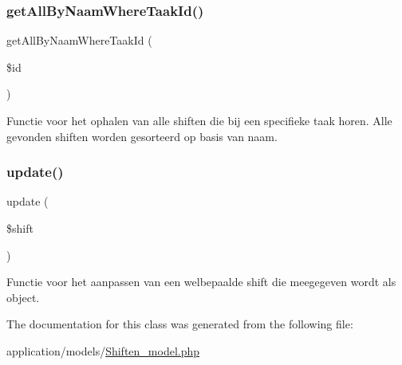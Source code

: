 \subsubsection{\texorpdfstring{get\+All\+By\+Naam\+Where\+Taak\+Id()}{getAllByNaamWhereTaakId()}}
{\footnotesize\ttfamily get\+All\+By\+Naam\+Where\+Taak\+Id (\begin{DoxyParamCaption}\item[{}]{\$id }\end{DoxyParamCaption})}



Functie voor het ophalen van alle shiften die bij een specifieke taak horen. Alle gevonden shiften worden gesorteerd op basis van naam. 

\mbox{\label{class_shiften___model_a0275d30c0139203609e59da92dc43790}} 
\subsubsection{\texorpdfstring{update()}{update()}}
{\footnotesize\ttfamily update (\begin{DoxyParamCaption}\item[{}]{\$shift }\end{DoxyParamCaption})}



Functie voor het aanpassen van een welbepaalde shift die meegegeven wordt als object. 



The documentation for this class was generated from the following file\+:\begin{DoxyCompactItemize}
\item 
application/models/\mbox{\hyperlink{_shiften__model_8php}{Shiften\+\_\+model.\+php}}\end{DoxyCompactItemize}
